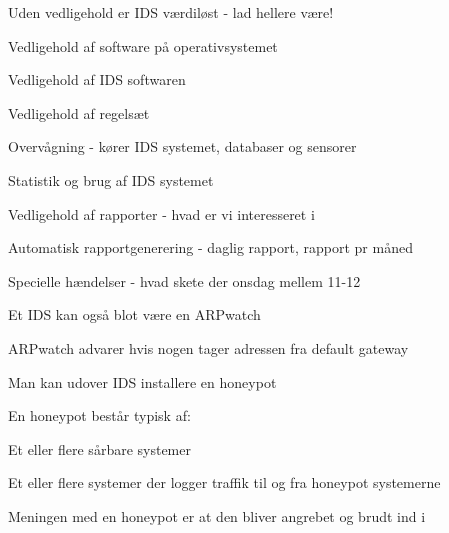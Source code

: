 \documentclass[Screen16to9,17pt]{foils}
\begin{document}

\begin{list1}
\item Uden vedligehold er IDS værdiløst - lad hellere være!
\begin{list2}
\item Vedligehold af software på operativsystemet
\item Vedligehold af IDS softwaren
\item Vedligehold af regelsæt
\end{list2}
\item Overvågning - kører IDS systemet, databaser og sensorer
\item Statistik og brug af IDS systemet
\begin{list2}
\item Vedligehold af rapporter - hvad er vi interesseret i
\item Automatisk rapportgenerering - daglig rapport, rapport pr måned
\item Specielle hændelser - hvad skete der onsdag mellem 11-12
\end{list2}
\item Et IDS kan også blot være en ARPwatch
\item ARPwatch advarer hvis nogen tager adressen fra default gateway
\end{list1}



\begin{list1}
\item Man kan udover IDS installere en honeypot
\item En honeypot består typisk af:
  \begin{list2}
    \item Et eller flere sårbare systemer
\item Et eller flere systemer der logger traffik til og fra honeypot
  systemerne
  \end{list2}
\item Meningen med en honeypot er at den bliver angrebet og brudt ind
  i
\end{list1}




\end{document}
